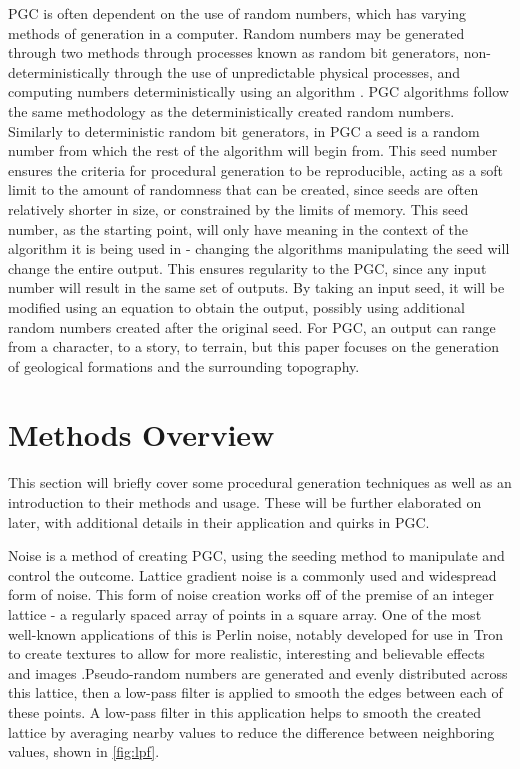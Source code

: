 \documentclass[10pt]{report}
\begin{document}
		PGC is often dependent on the use of random numbers, which has varying methods of generation in a computer. Random numbers may be generated through two methods through processes known as random bit generators, non-deterministically through the use of unpredictable physical processes, and computing numbers deterministically using an algorithm \cite{rng}. PGC algorithms follow the same methodology as the deterministically created random numbers. Similarly to deterministic random bit generators, in PGC a seed is a random number from which the rest of the algorithm will begin from. This seed number ensures the criteria for procedural generation to be reproducible, acting as a soft limit to the amount of randomness that can be created, since seeds are often relatively shorter in size, or constrained by the limits of memory. This seed number, as the starting point, will only have meaning in the context of the algorithm it is being used in - changing the algorithms manipulating the seed will change the entire output. This ensures regularity to the PGC, since any input number will result in the same set of outputs. By taking an input seed, it will be modified using an equation to obtain the output, possibly using additional random numbers created after the original seed. For PGC, an output can range from a character, to a story, to terrain, but this paper focuses on the generation of geological formations and the surrounding topography.
	
		\section{Methods Overview}
		This section will briefly cover some procedural generation techniques as well as an introduction to their methods and usage. These will be further elaborated on later, with additional details in their application and quirks in PGC. 
		
		Noise is a method of creating PGC, using the seeding method to manipulate and control the outcome. Lattice gradient noise is a commonly used and widespread form of noise. This form of noise creation works off of the premise of an integer lattice - a regularly spaced array of points in a square array\cite{integer-lattice}. One of the most well-known applications of this is Perlin noise, notably developed for use in Tron to create textures to allow for more realistic, interesting and believable effects and images \cite{ken-perlin}.Pseudo-random numbers are generated and evenly distributed across this lattice, then a low-pass filter is applied to smooth the edges between each of these points. A low-pass filter in this application helps to smooth the created lattice by averaging nearby values to reduce the difference between neighboring values, shown in \autoref{fig:lpf}. 
		
\end{document}

